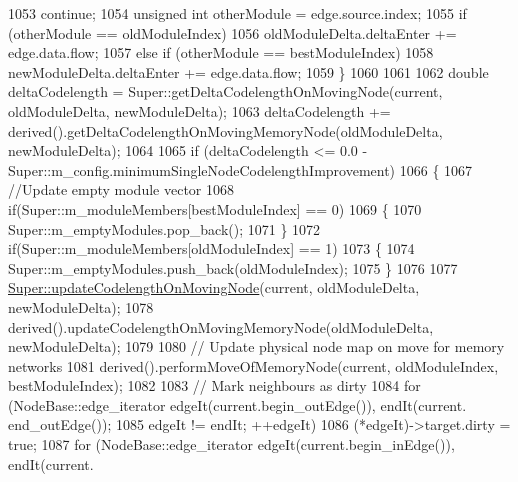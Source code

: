 \begin{DoxyCode}
{1053                             \textcolor{keywordflow}{continue};
1054                         \textcolor{keywordtype}{unsigned} \textcolor{keywordtype}{int} otherModule = edge.source.index;
1055                         \textcolor{keywordflow}{if} (otherModule == oldModuleIndex)
1056                             oldModuleDelta.deltaEnter += edge.data.flow;
1057                         \textcolor{keywordflow}{else} \textcolor{keywordflow}{if} (otherModule == bestModuleIndex)
1058                             newModuleDelta.deltaEnter += edge.data.flow;
1059                     \}
1060 
1061 
1062                     \textcolor{keywordtype}{double} deltaCodelength = Super::getDeltaCodelengthOnMovingNode(current, oldModuleDelta,
       newModuleDelta);
1063                     deltaCodelength += derived().getDeltaCodelengthOnMovingMemoryNode(oldModuleDelta, 
      newModuleDelta);
1064 
1065                     \textcolor{keywordflow}{if} (deltaCodelength <= 0.0 - Super::m\_config.minimumSingleNodeCodelengthImprovement)
1066                     \{
1067                         \textcolor{comment}{//Update empty module vector}
1068                         \textcolor{keywordflow}{if}(Super::m\_moduleMembers[bestModuleIndex] == 0)
1069                         \{
1070                             Super::m\_emptyModules.pop\_back();
1071                         \}
1072                         \textcolor{keywordflow}{if}(Super::m\_moduleMembers[oldModuleIndex] == 1)
1073                         \{
1074                             Super::m\_emptyModules.push\_back(oldModuleIndex);
1075                         \}
1076 
1077                         \mbox{\hyperlink{classInfomapGreedySpecialized_a6f4ff75d89a26f1b474ca5a2190878c7}{Super::updateCodelengthOnMovingNode}}(current, 
      oldModuleDelta, newModuleDelta);
1078                         derived().updateCodelengthOnMovingMemoryNode(oldModuleDelta, newModuleDelta);
1079 
1080                         \textcolor{comment}{// Update physical node map on move for memory networks}
1081                         derived().performMoveOfMemoryNode(current, oldModuleIndex, bestModuleIndex);
1082 
1083                         \textcolor{comment}{// Mark neighbours as dirty}
1084                         \textcolor{keywordflow}{for} (NodeBase::edge\_iterator edgeIt(current.begin\_outEdge()), endIt(current.
      end\_outEdge());
1085                                 edgeIt != endIt; ++edgeIt)
1086                             (*edgeIt)->target.dirty = \textcolor{keyword}{true};
1087                         for (NodeBase::edge\_iterator edgeIt(current.begin\_inEdge()), endIt(current.
}
\end{DoxyCode}
